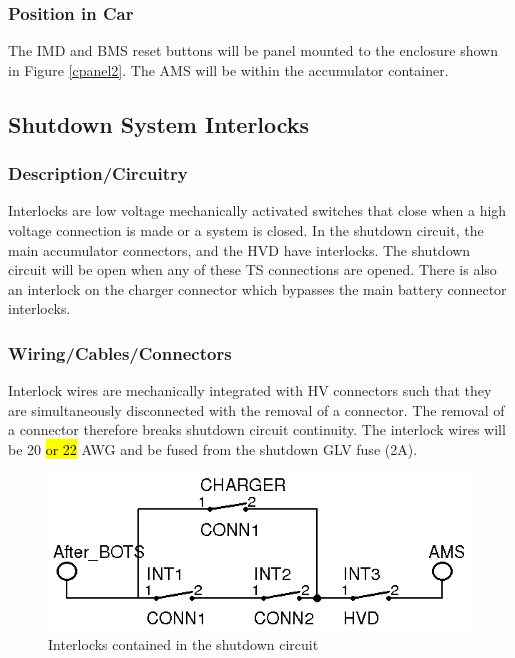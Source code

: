 \documentclass{article}
\DeclareRobustCommand{\hlr}[1]{{\sethlcolor{red}\hl{#1}}}
\begin{document}
        \subsubsection{Position in Car}

            The IMD and BMS reset buttons will be panel mounted to the enclosure shown in Figure \ref{cpanel2}. The AMS will be within the accumulator container.

    \subsection{Shutdown System Interlocks} \label{interlocks}

        \subsubsection{Description/Circuitry}

            Interlocks are low voltage mechanically activated switches that close when a high voltage connection is made or a system is closed.  In the shutdown circuit, the main accumulator connectors, and the HVD have interlocks. The shutdown circuit will be open when any of these TS connections are opened. There is also an interlock on the charger connector which bypasses the main battery connector interlocks.

        \subsubsection{Wiring/Cables/Connectors}

            Interlock wires are mechanically integrated with HV connectors such that they are simultaneously disconnected with the removal of a connector. The removal of a connector therefore breaks shutdown circuit continuity. The interlock wires will be 20 \hlr{or 22} AWG and be fused from the shutdown GLV fuse (2A).

            \begin{figure}[H]
                \centering
                \includegraphics{interlocks}
                \caption{Interlocks contained in the shutdown circuit}
                \label{interlockschem}
            \end{figure}
\end{document}
